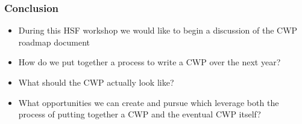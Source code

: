 \begin{frame}
\frametitle{Conclusion}

\begin{itemize}
\item During this HSF workshop we would like to begin a discussion of the CWP roadmap document
\item How do we put together a process to write a CWP over the next year?
\item What should the CWP actually look like?
\item What opportunities we can create and pursue which leverage both the process of putting together a CWP and the eventual CWP itself?
\end{itemize}



\end{frame}



